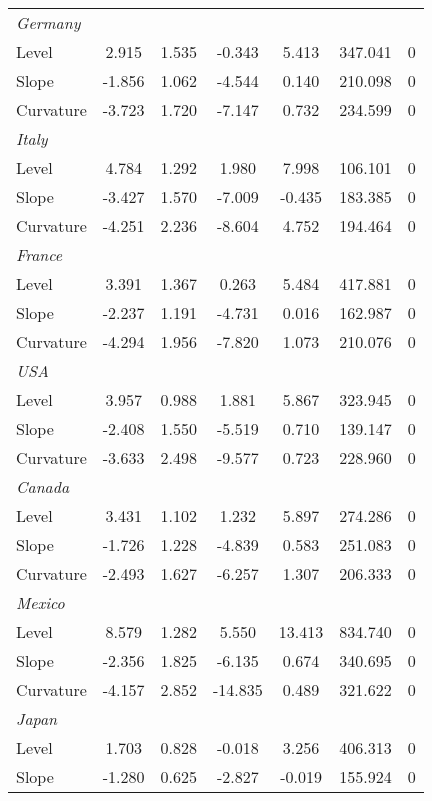 \documentclass{article}
\begin{document}
\begin{table}[ht]
\begin{tabular}{l c c c c c c}
\textit{Germany}	&		&		&		&		&		&		\\
Level	&	2.915	&	1.535	&	-0.343	&	5.413	&	347.041	&	0	\\
Slope	&	-1.856	&	1.062	&	-4.544	&	0.140	&	210.098	&	0	\\
\medskip													
Curvature	&	-3.723	&	1.720	&	-7.147	&	0.732	&	234.599	&	0	\\
\textit{Italy}	&		&		&		&		&		&		\\
Level	&	4.784	&	1.292	&	1.980	&	7.998	&	106.101	&	0	\\
Slope	&	-3.427	&	1.570	&	-7.009	&	-0.435	&	183.385	&	0	\\
\medskip													
Curvature	&	-4.251	&	2.236	&	-8.604	&	4.752	&	194.464	&	0	\\
\textit{France}	&		&		&		&		&		&		\\
Level	&	3.391	&	1.367	&	0.263	&	5.484	&	417.881	&	0	\\
Slope	&	-2.237	&	1.191	&	-4.731	&	0.016	&	162.987	&	0	\\
\medskip													
Curvature	&	-4.294	&	1.956	&	-7.820	&	1.073	&	210.076	&	0	\\
\textit{USA}	&		&		&		&		&		&		\\
Level	&	3.957	&	0.988	&	1.881	&	5.867	&	323.945	&	0	\\
Slope	&	-2.408	&	1.550	&	-5.519	&	0.710	&	139.147	&	0	\\
\medskip													
Curvature	&	-3.633	&	2.498	&	-9.577	&	0.723	&	228.960	&	0	\\
\textit{Canada}	&		&		&		&		&		&		\\
Level	&	3.431	&	1.102	&	1.232	&	5.897	&	274.286	&	0	\\
Slope	&	-1.726	&	1.228	&	-4.839	&	0.583	&	251.083	&	0	\\
\medskip													
Curvature	&	-2.493	&	1.627	&	-6.257	&	1.307	&	206.333	&	0	\\
\textit{Mexico}	&		&		&		&		&		&		\\
Level	&	8.579	&	1.282	&	5.550	&	13.413	&	834.740	&	0	\\
Slope	&	-2.356	&	1.825	&	-6.135	&	0.674	&	340.695	&	0	\\
\medskip													
Curvature	&	-4.157	&	2.852	&	-14.835	&	0.489	&	321.622	&	0	\\
\textit{Japan}	&		&		&		&		&		&		\\
Level	&	1.703	&	0.828	&	-0.018	&	3.256	&	406.313	&	0	\\
Slope	&	-1.280	&	0.625	&	-2.827	&	-0.019	&	155.924	&	0	\\

\end{tabular}
\end{table}
\end{document}
